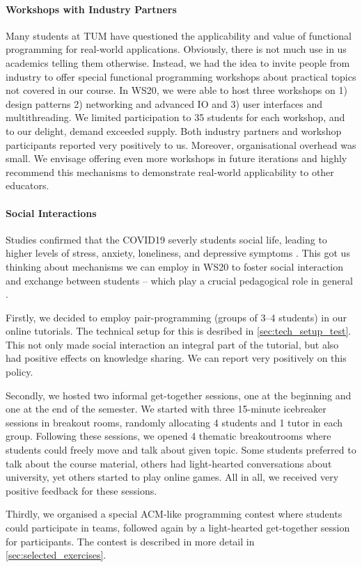 \paragraph{Workshops with Industry Partners}
Many students at TUM have questioned the applicability and value of functional programming for real-world applications.
Obviously, there is not much use in us academics telling
them otherwise.
Instead, we had the idea to invite people from industry
to offer special functional programming workshops about
practical topics not covered in our course.
In WS20,
we were able to host three workshops on 1) design patterns
2) networking and advanced IO and 3) user interfaces and multithreading.
We limited participation to 35 students for each workshop,
and to our delight, demand exceeded supply.
Both industry partners and workshop participants
reported very positively to us.
Moreover, organisational overhead was small.
We envisage offering even more workshops in future iterations and highly recommend this mechanisms to demonstrate real-world applicability to other educators.

\paragraph{Social Interactions}
Studies confirmed that the COVID19 severly
students social life,
leading to higher levels of stress, anxiety, loneliness, and depressive symptoms \citep{students_lockdown1}.
This got us thinking about mechanisms we
can employ in WS20 to foster social interaction and exchange between students
-- which play a crucial pedagogical role in general .

Firstly, we decided to employ pair-programming (groups of 3--4 students)
in our online tutorials.
The technical setup for this is desribed in \cref{sec:tech_setup_test}.
This not only made social interaction an integral part of the tutorial,
but also had positive effects on knowledge sharing.
We can report very positively on this policy.

Secondly, we hosted two informal get-together sessions,
one at the beginning and one at the end of the semester.
We started with three 15-minute icebreaker sessions in breakout rooms,
randomly allocating 4 students and 1 tutor in each group.
Following these sessions,
we opened 4 thematic breakoutrooms where students could freely move and talk about
given topic.
Some students preferred to talk about the course material, others had
light-hearted conversations about university, yet others started to play online games.
All in all, we received very positive feedback for these sessions.

Thirdly, we organised a special
ACM-like programming contest
where students could participate in teams,
followed again by a light-hearted get-together session
for participants.
The contest is described in more detail in \cref{sec:selected_exercises}.

